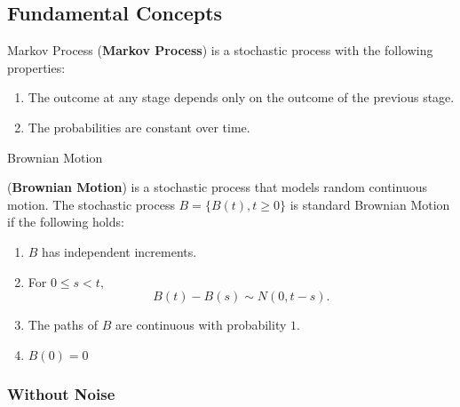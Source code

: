 \subsection{Fundamental Concepts}
%
\begin{frame}{Markov Process}
(\textbf{Markov Process}) is a stochastic process with the following properties: 
\begin{enumerate}
\item The outcome at any stage depends only on the outcome of the previous stage.
\item The probabilities are constant over time.   
\end{enumerate}
\end{frame}


\begin{frame}{Brownian Motion}
\begin{definition}(\textbf{Brownian Motion}) is a stochastic process that models random continuous motion. The stochastic process $B=\{B(t), t\geq 0\}$ is standard Brownian Motion if the following holds:
\begin{enumerate}
\item $B$ has independent increments.
\item For $0 \leq s < t,$ $$B(t)-B(s) \sim N(0,t-s).$$
\item The paths of $B$ are continuous with probability $1$.
\item $B(0)=0$ 
\end{enumerate}
\end{definition}
\end{frame}

\begin{frame}
  \frametitle{Without Noise}
\vfill

\begin{center}
\end{center}

\vfill
  \cite{doi:10.1137/S0036144500378302}
\end{frame}

